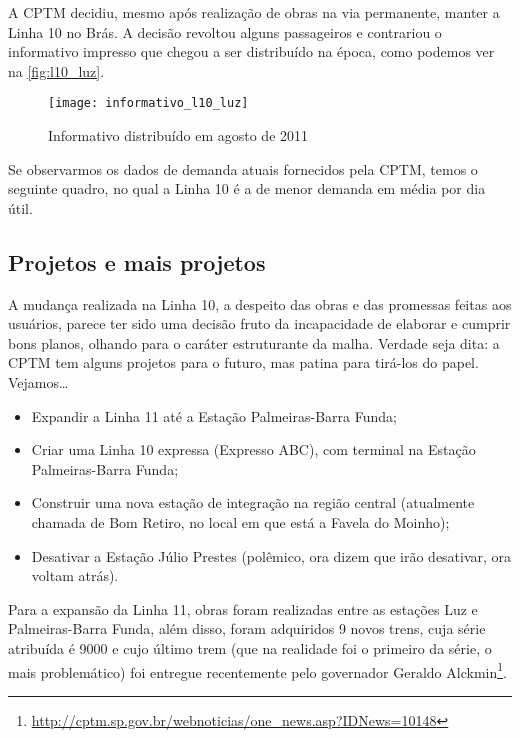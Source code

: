 \documentclass[11pt,fleqn]{book} %
\begin{document}
A CPTM decidiu, mesmo após realização de obras na via permanente, manter a Linha 10 no Brás. A decisão revoltou alguns passageiros e contrariou o informativo impresso que chegou a ser distribuído na época, como podemos ver na \autoref{fig:l10_luz}.

\begin{figure}[htb]
	\centering
	\texttt{[image: informativo\_l10\_luz]}
	\caption[Informativo agosto/2011]{Informativo distribuído em agosto de 2011}
	\label{fig:l10_luz}
\end{figure}

Se observarmos os dados de demanda atuais fornecidos pela CPTM, temos o seguinte quadro, no qual a Linha 10 é a de menor demanda em média por dia útil.


\subsection{Projetos e mais projetos}

A mudança realizada na Linha 10, a despeito das obras e das promessas feitas aos usuários, parece ter sido uma decisão fruto da incapacidade de elaborar e cumprir bons planos, olhando para o caráter estruturante da malha. Verdade seja dita: a CPTM tem alguns projetos para o futuro, mas patina para tirá-los do papel. Vejamos\dots

\begin{itemize}
	\item Expandir a Linha 11 até a Estação Palmeiras-Barra Funda;
	\item Criar uma Linha 10 expressa (Expresso ABC), com terminal na Estação Palmeiras-Barra Funda;
	\item Construir uma nova estação de integração na região central (atualmente chamada de Bom Retiro, no local em que está a Favela do Moinho);
	\item Desativar a Estação Júlio Prestes (polêmico, ora dizem que irão desativar, ora voltam atrás).
\end{itemize}


Para a expansão da Linha 11, obras foram realizadas entre as estações Luz e Palmeiras-Barra Funda, além disso, foram adquiridos 9 novos trens, cuja série atribuída é 9000 e cujo último trem (que na realidade foi o primeiro da série, o mais problemático) foi entregue recentemente pelo governador Geraldo Alckmin\footnote{\url{http://cptm.sp.gov.br/webnoticias/one_news.asp?IDNews=10148}}.
\end{document}
